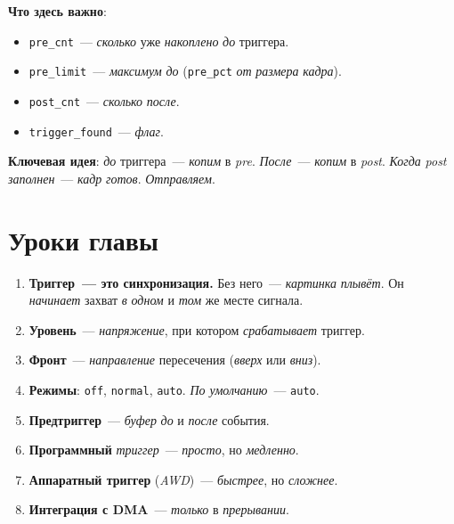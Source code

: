 \textbf{Что здесь важно}:
\begin{itemize}
    \item \texttt{pre\_cnt}~--- \emph{сколько} уже \emph{накоплено}
          \emph{до} триггера.
    \item \texttt{pre\_limit}~--- \emph{максимум} \emph{до}
          (\texttt{pre\_pct} \emph{от} \emph{размера} \emph{кадра}).
    \item \texttt{post\_cnt}~--- \emph{сколько} \emph{после}.
    \item \texttt{trigger\_found}~--- \emph{флаг}.
\end{itemize}

\begin{keybox}
\textbf{Ключевая идея}: \emph{до} триггера~--- \emph{копим}
в \emph{pre}. \emph{После}~--- \emph{копим} в \emph{post}.
\emph{Когда} \emph{post} \emph{заполнен}~--- \emph{кадр}
\emph{готов}. \emph{Отправляем}.
\end{keybox}

\section{Уроки главы}
\label{sec:trigger-lessons}

\begin{enumerate}
    \item \textbf{Триггер~--- это синхронизация.} Без
          него~--- \emph{картинка} \emph{плывёт}. Он
      \emph{начинает} захват \emph{в} \emph{одном} и \emph{том}
      же месте сигнала.
    \item \textbf{Уровень}~--- \emph{напряжение}, при котором
          \emph{срабатывает} триггер.
    \item \textbf{Фронт}~--- \emph{направление} пересечения
          (\emph{вверх} или \emph{вниз}).
    \item \textbf{Режимы}: \texttt{off}, \texttt{normal},
          \texttt{auto}.  \emph{По умолчанию}~--- \texttt{auto}.
    \item \textbf{Предтриггер}~--- \emph{буфер} \emph{до}
          и \emph{после} события.
    \item \textbf{Программный} \emph{триггер}~--- \emph{просто},
          но \emph{медленно}.
    \item \textbf{Аппаратный триггер} (\emph{AWD})~--- \emph{быстрее},
          но \emph{сложнее}. 
    \item \textbf{Интеграция с DMA}~--- \emph{только} в
          \emph{прерывании}.
\end{enumerate}


